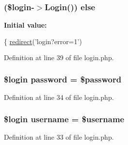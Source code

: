 \subsubsection[{\texorpdfstring{else}{else}}]{ (\$login-\/$>$Login()) else}\hypertarget{actions_2user_2login_8php_a514c4a3dcf615a7dd4fc6a15e5d1761b}{}\label{actions_2user_2login_8php_a514c4a3dcf615a7dd4fc6a15e5d1761b}
{\bfseries Initial value\+:}
\begin{DoxyCode}
\{
        \hyperlink{ossn_8lib_8system_8php_a33cafdb93398ec540993c12c1daa0c48}{redirect}(\textcolor{stringliteral}{'login?error=1'})
\end{DoxyCode}


Definition at line 39 of file login.\+php.

\subsubsection[{\texorpdfstring{password}{password}}]{\setlength{\rightskip}{0pt plus 5cm}\$login password = \$password}\hypertarget{actions_2user_2login_8php_a04cab294daa984a97618ae9c32c2e8e8}{}\label{actions_2user_2login_8php_a04cab294daa984a97618ae9c32c2e8e8}


Definition at line 34 of file login.\+php.

\subsubsection[{\texorpdfstring{username}{username}}]{\setlength{\rightskip}{0pt plus 5cm}\$login username = \$username}\hypertarget{actions_2user_2login_8php_a5ae6e9dd2f76961089b9aa789ef054f5}{}\label{actions_2user_2login_8php_a5ae6e9dd2f76961089b9aa789ef054f5}


Definition at line 33 of file login.\+php.

